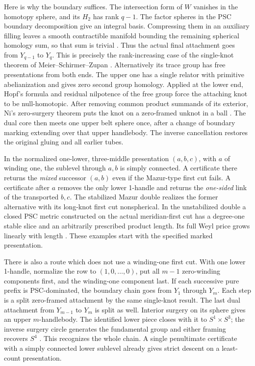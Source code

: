 \documentclass[11pt,letterpaper]{article}
\numberwithin{equation}{section}
\begin{document}
Here is why the boundary suffices. The intersection form of \(W\)
vanishes in the homotopy sphere, and its \(H_2\) has rank \(q-1\).
The factor spheres in the PSC boundary decomposition give an
integral basis. Compressing them in an auxiliary filling leaves
a smooth contractible manifold bounding the remaining spherical
homology sum, so that sum is trivial
\cite[Proposition 4.2]{ChodoshMaximoMukherjee2024Complete}.
Thus the actual final attachment goes from \(Y_{q-1}\) to \(Y_q\).
This is precisely the rank-increasing case of the single-knot theorem
of Meier--Schirmer--Zupan \cite[Theorem 5.1]{MeierSchirmerZupan2016Trisections}.
Alternatively its trace group has free presentations from both ends. The upper
one has a single relator with primitive abelianization and gives
zero second group homology. Applied at the lower end, Hopf's
formula and residual nilpotence of the free group force the attaching
knot to be null-homotopic. After removing common product summands
of its exterior, Ni's zero-surgery theorem puts the knot on a
zero-framed unknot in a ball \cite{Ni2023Null,Baker2026HandleCuts}.
The dual core then meets one upper belt sphere once, after a change
of boundary marking extending over that upper handlebody. The inverse
cancellation restores the original gluing and all earlier tubes.

In the normalized one-lower, three-middle presentation \((a,b,c)\),
with \(a\) of winding one, the sublevel through \(a,b\) is simply
connected. A certificate there returns the \emph{mixed} successor
\((a,b)\) even if the Mazur-type first cut fails. A certificate after
\(a\) removes the only lower 1-handle and returns the \emph{one-sided} link of the transported
\(b,c\). The stabilized Mazur double realizes the former alternative
with its long-knot first cut nonspherical. In the unstabilized double
a closed PSC metric constructed on the actual meridian-first cut has
a degree-one stable slice and an arbitrarily prescribed product
length. Its full Weyl price grows linearly with length
\cite{Baker2026HandleCuts}. These examples start with the specified
marked presentation.

There is also a route which does not use a winding-one first cut.
With one lower 1-handle, normalize the row to \((1,0,\ldots,0)\), put all
\(m-1\) zero-winding components first, and the winding-one component last. If each successive pure prefix is PSC-dominated, the boundary
chain goes from \(Y_1\) through \(Y_m\). Each step is a split
zero-framed attachment by the same single-knot result. The last
dual attachment from \(Y_{m-1}\) to \(Y_m\) is split as well.
Interior surgery on its sphere gives an upper \(m\)-handlebody.
The identified lower piece closes with it to \(S^1\times S^3\);
the inverse surgery circle generates the fundamental group
and either framing recovers \(S^4\) \cite{Baker2026HandleCuts}.
This recognizes the whole chain. A single penultimate certificate
with a simply connected lower sublevel already gives strict descent
on a least-count presentation.
\end{document}
